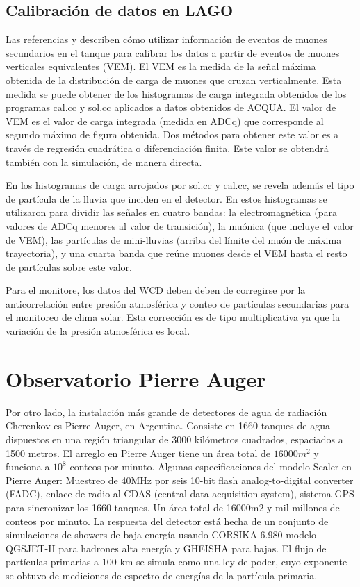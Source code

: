 \documentclass{book}
\begin{document}
\subsection{Calibraci\'on de datos en LAGO}

Las referencias \citep{ALLISON} y \citep{ALARCON} describen c\'omo utilizar informaci\'on de eventos de muones secundarios en el tanque para calibrar los datos a partir de eventos de muones verticales equivalentes (VEM). El VEM es la medida de la se\~nal m\'axima obtenida de la distribuci\'on de carga de muones que cruzan verticalmente. Esta medida se puede obtener de los histogramas de carga integrada obtenidos de los programas cal.cc y sol.cc aplicados a datos obtenidos de ACQUA. El valor de VEM es el valor de carga integrada (medida en ADCq) que corresponde al segundo m\'aximo de figura obtenida. Dos m\'etodos para obtener este valor es a trav\'es de regresi\'on cuadr\'atica o diferenciaci\'on finita. Este valor se obtendr\'a tambi\'en con la simulaci\'on, de manera directa.

En los histogramas de carga arrojados por sol.cc y cal.cc, se revela adem\'as el tipo de part\'icula de la lluvia que inciden en el detector. En \citep{ASOREY} estos histogramas se utilizaron para dividir las se\~nales en cuatro bandas: la electromagn\'etica (para valores de ADCq menores al valor de transici\'on), la mu\'onica (que incluye el valor de VEM), las part\'iculas de mini-lluvias (arriba del l\'imite del mu\'on de m\'axima trayectoria), y una cuarta banda que re\'une muones desde el VEM hasta el resto de part\'iculas sobre este valor. \citep{Yunior}

Para el monitore, los datos del WCD deben deben de corregirse por la anticorrelaci\'on entre presi\'on atmosf\'erica y conteo de part\'iculas secundarias para el monitoreo de clima solar. Esta correcci\'on es de tipo multiplicativa ya que la variaci\'on de la presi\'on atmosf\'erica es local. \citep{Yunior} \citep{ASOREY}

\section{Observatorio Pierre Auger}

Por otro lado, la instalaci\'on m\'as grande de detectores de agua de radiaci\'on Cherenkov es Pierre Auger, en Argentina. Consiste en 1660 tanques de agua dispuestos en una regi\'on triangular de 3000 kil\'ometros cuadrados, espaciados a 1500 metros. El arreglo en Pierre Auger tiene un \'area total de $16000m^{2}$ y funciona a $10^8$ conteos por minuto. Algunas especificaciones del modelo Scaler en Pierre Auger: Muestreo de 40MHz por seis 10-bit flash analog-to-digital converter (FADC), enlace de radio al CDAS (central data acquisition system), sistema GPS para sincronizar los 1660 tanques. Un \'area total de 16000m2 y mil millones de conteos por minuto. La respuesta del detector est\'a hecha de un conjunto de simulaciones de showers de baja energ\'ia usando CORSIKA 6.980 modelo QGSJET-II para hadrones alta energ\'ia y GHEISHA para bajas. El flujo de part\'iculas primarias a 100 km se simula como una ley de poder, cuyo exponente se obtuvo de mediciones de espectro de energ\'ias de la part\'icula primaria. \citep{VILLASENOR}
\end{document}
